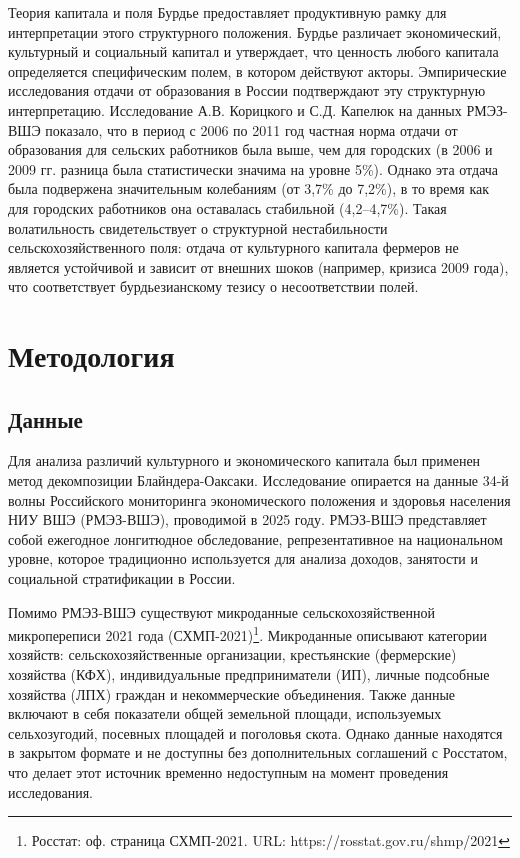 \documentclass[14pt, a4paper]{article}
\begin{document}
	Теория капитала и поля Бурдье предоставляет продуктивную рамку для интерпретации этого структурного положения. Бурдье различает экономический, культурный и социальный капитал и утверждает, что ценность любого капитала определяется специфическим полем, в котором действуют акторы. Эмпирические исследования отдачи от образования в России подтверждают эту структурную интерпретацию. Исследование А.В. Корицкого и С.Д. Капелюк \cite{koritsky2014urbanization} на данных РМЭЗ-ВШЭ показало, что в период с 2006 по 2011 год частная норма отдачи от образования для сельских работников была выше, чем для городских (в 2006 и 2009 гг. разница была статистически значима на уровне 5\%). Однако эта отдача была подвержена значительным колебаниям (от 3,7\% до 7,2\%), в то время как для городских работников она оставалась стабильной (4,2–4,7\%). Такая волатильность свидетельствует о структурной нестабильности сельскохозяйственного поля: отдача от культурного капитала фермеров не является устойчивой и зависит от внешних шоков (например, кризиса 2009 года), что соответствует бурдьезианскому тезису о несоответствии полей.
	
	\section{Методология}\label{sec:methods}
	\subsection{Данные}
	Для анализа различий культурного и экономического капитала был применен метод декомпозиции Блайндера-Оаксаки. Исследование опирается на данные 34-й волны Российского мониторинга экономического положения и здоровья населения НИУ ВШЭ (РМЭЗ-ВШЭ), проводимой в 2025 году. РМЭЗ-ВШЭ представляет собой ежегодное лонгитюдное обследование, репрезентативное на национальном уровне, которое традиционно используется для анализа доходов, занятости и социальной стратификации в России. 
	
	Помимо РМЭЗ-ВШЭ существуют микроданные сельскохозяйственной микропереписи 2021 года (СХМП-2021)\footnote{Росстат: оф. страница СХМП-2021. URL: https://rosstat.gov.ru/shmp/2021}. Микроданные описывают категории хозяйств: сельскохозяйственные организации, крестьянские (фермерские) хозяйства (КФХ), индивидуальные предприниматели (ИП), личные подсобные хозяйства (ЛПХ) граждан и некоммерческие объединения. Также данные включают в себя показатели общей земельной площади, используемых сельхозугодий, посевных площадей и поголовья скота. Однако данные находятся в закрытом формате и не доступны без дополнительных соглашений с Росстатом, что делает этот источник временно недоступным на момент проведения исследования.
	
\end{document}
